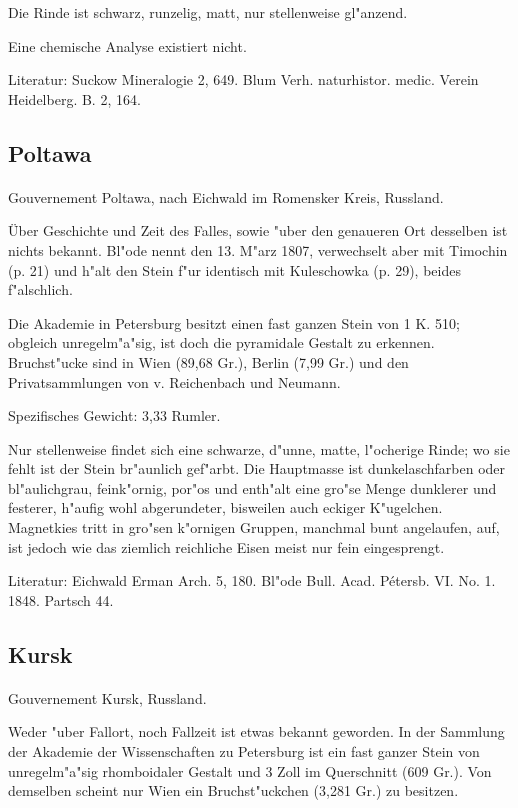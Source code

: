 \documentclass[a4paper, 11pt, oneside]{article}
\begin{document}
Die Rinde ist schwarz, runzelig, matt, nur stellenweise gl"anzend.

Eine chemische Analyse existiert nicht.

Literatur: Suckow Mineralogie 2, 649. Blum Verh. naturhistor. medic. Verein Heidelberg. B. 2, 164.

\subsection{Poltawa}
\normalsize
\paragraph{}
Gouvernement Poltawa, nach Eichwald im Romensker Kreis, Russland.

Über Geschichte und Zeit des Falles, sowie "uber den genaueren Ort desselben ist nichts bekannt. Bl"ode nennt den 13. M"arz 1807, verwechselt aber mit Timochin (p. 21) und h"alt den Stein f"ur identisch mit Kuleschowka (p. 29), beides f"alschlich.

Die Akademie in Petersburg besitzt einen fast ganzen Stein von 1 K. 510; obgleich unregelm"a"sig, ist doch die pyramidale Gestalt zu erkennen. Bruchst"ucke sind in Wien (89,68 Gr.), Berlin (7,99 Gr.) und den Privatsammlungen von v. Reichenbach und Neumann.

Spezifisches Gewicht: 3,33 Rumler.

Nur stellenweise findet sich eine schwarze, d"unne, matte, l"ocherige Rinde; wo sie fehlt ist der Stein br"aunlich gef"arbt. Die Hauptmasse ist dunkelaschfarben oder bl"aulichgrau, feink"ornig, por"os und enth"alt eine gro"se Menge dunklerer und festerer, h"aufig wohl abgerundeter, bisweilen auch eckiger K"ugelchen. Magnetkies tritt in gro"sen k"ornigen Gruppen, manchmal bunt angelaufen, auf, ist jedoch wie das ziemlich reichliche Eisen meist nur fein eingesprengt.

Literatur: Eichwald Erman Arch. 5, 180. Bl"ode Bull. Acad. Pétersb. VI. No. 1. 1848. Partsch 44.

\subsection{Kursk}
\normalsize
\paragraph{}
Gouvernement Kursk, Russland.

Weder "uber Fallort, noch Fallzeit ist etwas bekannt geworden. In der Sammlung der Akademie der Wissenschaften zu Petersburg ist ein fast ganzer Stein von unregelm"a"sig rhomboidaler Gestalt und 3 Zoll im Querschnitt (609 Gr.). Von demselben scheint nur Wien ein Bruchst"uckchen (3,281 Gr.) zu besitzen.
\end{document}

